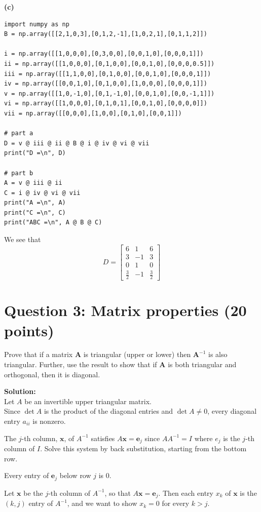 \documentclass[11pt]{article}
\begin{document}
\textbf{(c)}
\begin{verbatim}
import numpy as np
B = np.array([[2,1,0,3],[0,1,2,-1],[1,0,2,1],[0,1,1,2]])

i = np.array([[1,0,0,0],[0,3,0,0],[0,0,1,0],[0,0,0,1]])
ii = np.array([[1,0,0,0],[0,1,0,0],[0,0,1,0],[0,0,0,0.5]])
iii = np.array([[1,1,0,0],[0,1,0,0],[0,0,1,0],[0,0,0,1]])
iv = np.array([[0,0,1,0],[0,1,0,0],[1,0,0,0],[0,0,0,1]])
v = np.array([[1,0,-1,0],[0,1,-1,0],[0,0,1,0],[0,0,-1,1]])
vi = np.array([[1,0,0,0],[0,1,0,1],[0,0,1,0],[0,0,0,0]])
vii = np.array([[0,0,0],[1,0,0],[0,1,0],[0,0,1]])

# part a
D = v @ iii @ ii @ B @ i @ iv @ vi @ vii
print("D =\n", D)

# part b
A = v @ iii @ ii
C = i @ iv @ vi @ vii
print("A =\n", A)
print("C =\n", C)
print("ABC =\n", A @ B @ C)
\end{verbatim}
We see that
$$
D=\begin{bmatrix}
6&1&6\\
3&-1&3\\
0&1&0\\
\frac32&-1&\frac32
\end{bmatrix}
$$

\newpage
\section*{Question 3: Matrix properties (20 points)}

Prove that if a matrix $\mathbf{A}$ is triangular (upper or lower) then $\mathbf{A}^{-1}$ is also triangular. Further, use the result to show that if $\mathbf{A}$ is both triangular and orthogonal, then it is diagonal.

\textbf{Solution:}\\
Let $A$ be an invertible upper triangular matrix. \\
Since $\det A$ is the product of the diagonal entries and $\det A \neq 0$, every diagonal entry $a_{ii}$ is nonzero.
\medskip

\noindent The $j$-th column, $\mathbf{x}$, of $A^{-1}$ satisfies $A\mathbf{x} = \mathbf{e}_j$ since $AA^{-1}=I$ where $e_j$ is the $j$-th column of $I$. 
Solve this system by back substitution, starting from the bottom row.
\smallskip

Every entry of $\mathbf{e}_j$ below row $j$ is $0$.

Let $\mathbf{x}$ be the $j$-th column of $A^{-1}$, so that $A\mathbf{x} = \mathbf{e}_j$. Then each entry $x_k$ of $\mathbf{x}$ is the $(k,j)$ entry of $A^{-1}$, and we want to show $x_k = 0$ for every $k > j$.
\bigskip
\end{document}

